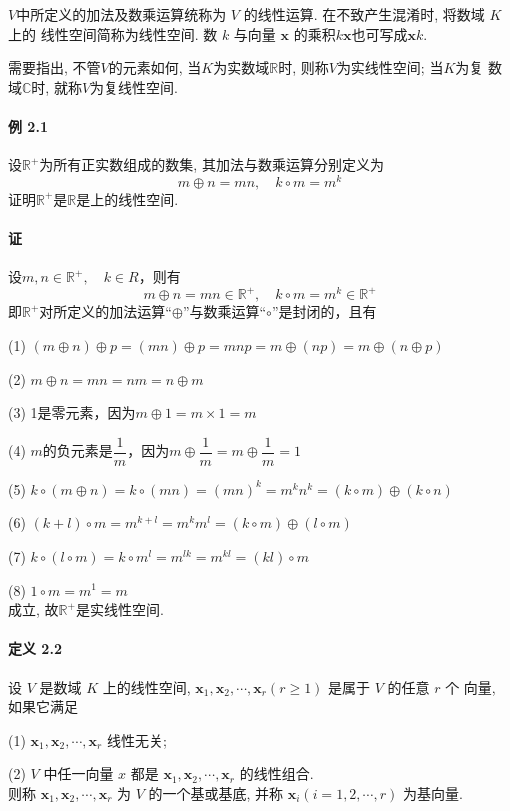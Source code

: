 \par $V$中所定义的加法及数乘运算统称为 $V$ 的线性运算. 在不致产生混淆时, 将数域 $K$ 上的
线性空间简称为线性空间. 数 $k$ 与向量 $\bm{x}$ 的乘积$k\bm{x}$也可写成$\bm{x}k$.

\par 需要指出, 不管$V$的元素如何, 当$K$为实数域$\mathbb{R}$时, 则称$V$为实线性空间; 当$K$为复
数域$\mathbb{C}$时, 就称$V$为复线性空间.

\paragraph*{例 2.1} 设$\mathbb{R^{+}}$为所有正实数组成的数集, 其加法与数乘运算分别定义为
$$
    m \oplus n = mn, \quad k \circ m = m^k
$$
证明$\mathbb{R^{+}}$是$\mathbb{R}$是上的线性空间. \par

\paragraph*{证} 设$m,n\in \mathbb{R^+}, \quad k \in R$，则有
$$
    m \oplus n = mn \in \mathbb{R^+}, \quad k \circ m = m^k \in \mathbb{R^+}
$$
即$\mathbb{R^+}$对所定义的加法运算“$\oplus$”与数乘运算“$\circ$”是封闭的，且有

\par (1) $(m \oplus n) \oplus p = (mn) \oplus p = mnp = m \oplus (np) = m \oplus (n \oplus p)$
\par (2) $m \oplus n = mn = nm = n \oplus m$
\par (3) 1是零元素，因为$m \oplus 1 = m \times 1 = m$
\par (4) $m$的负元素是$\dfrac{1}{m}$，因为$m \oplus \dfrac{1}{m} = m \oplus \dfrac{1}{m} = 1$
\par (5) $k \circ (m \oplus n) = k \circ (mn) = (mn)^k = m^kn^k = (k \circ m) \oplus (k \circ n)$
\par (6) $(k + l) \circ m = m^{k + l} = m^km^l = (k \circ m) \oplus (l \circ m)$
\par (7) $k \circ (l \circ m) = k \circ m^l = m^{lk} = m^{kl} = (kl) \circ m$
\par (8) $1 \circ m = m^1 = m$
\\ 成立, 故$\mathbb{R^+}$是实线性空间.

\paragraph*{定义 2.2} 设 $V$ 是数域 $K$ 上的线性空间, $\bm{x}_1,\bm{x}_2,\cdots,\bm{x}_r(r\geqslant 1)$ 是属于 $V$ 的任意 $r$ 个
向量, 如果它满足
\par (1) $\bm{x}_1,\bm{x}_2,\cdots,\bm{x}_r$ 线性无关;
\par (2) $V$ 中任一向量 $x$ 都是 $\bm{x}_1,\bm{x}_2,\cdots,\bm{x}_r$ 的线性组合.
\\ 则称 $\bm{x}_1,\bm{x}_2,\cdots,\bm{x}_r$ 为 $V$ 的一个基或基底, 并称 $\bm{x}_i(i=1,2,\cdots,r)$ 为基向量.


